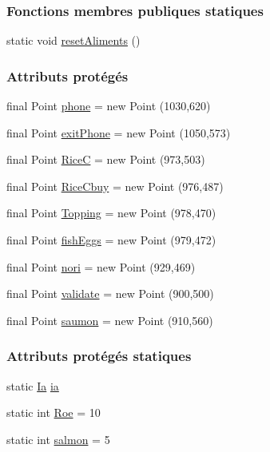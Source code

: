 \subsubsection*{Fonctions membres publiques statiques}
\begin{DoxyCompactItemize}
\item 
static void \hyperlink{classSuchi_1_1Recette_a99446c824f7bffe26c36e8433a4b18b3}{reset\+Aliments} ()
\end{DoxyCompactItemize}
\subsubsection*{Attributs protégés}
\begin{DoxyCompactItemize}
\item 
final Point \hyperlink{classSuchi_1_1Recette_a89465932bd180079526cfc1f8b8af456}{phone} = new Point (1030,620)
\item 
final Point \hyperlink{classSuchi_1_1Recette_ac7ff51ea8fa06174c38c52121b0ef767}{exit\+Phone} = new Point (1050,573)
\item 
final Point \hyperlink{classSuchi_1_1Recette_a36ec8dc3a30b3f1dba74d3aa354f9f11}{Rice\+C} = new Point (973,503)
\item 
final Point \hyperlink{classSuchi_1_1Recette_afc63b1a3fa7d921d606dc0c99d52cdf4}{Rice\+Cbuy} = new Point (976,487)
\item 
final Point \hyperlink{classSuchi_1_1Recette_a4810b2254c050209fba27757066668b3}{Topping} = new Point (978,470)
\item 
final Point \hyperlink{classSuchi_1_1Recette_a9d19fcc0de54e124694592bc35d97a1d}{fish\+Eggs} = new Point (979,472)
\item 
final Point \hyperlink{classSuchi_1_1Recette_ab86193f9fe4491190e232c4e7f93bed5}{nori} = new Point (929,469)
\item 
final Point \hyperlink{classSuchi_1_1Recette_aff16265c9b0b819091af71f64ef84be7}{validate} = new Point (900,500)
\item 
final Point \hyperlink{classSuchi_1_1Recette_a17aeabd21e3d4d55d7caae9a40bfc6a1}{saumon} = new Point (910,560)
\end{DoxyCompactItemize}
\subsubsection*{Attributs protégés statiques}
\begin{DoxyCompactItemize}
\item 
static \hyperlink{classSuchi_1_1Ia}{Ia} \hyperlink{classSuchi_1_1Recette_add9d95ee8955e02592b553c7e4b719a0}{ia}
\item 
static int \hyperlink{classSuchi_1_1Recette_acee61a97ab7dd56b74e2ef3decb5f3c4}{Roe} = 10
\item 
static int \hyperlink{classSuchi_1_1Recette_a2e9711072decb1bd2a64a4328e566d73}{salmon} = 5
\end{DoxyCompactItemize}
